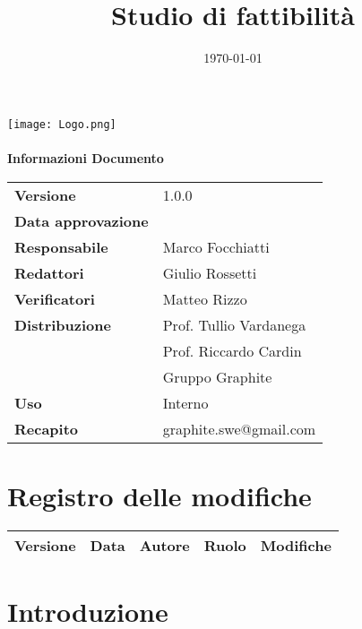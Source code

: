 \documentclass[openany,12pt,a4paper]{report}
\title{Studio di fattibilità}
\author{}
\date{\today}
\newcommand{\versione}{1.0.0}
\begin{document}
	\makeatletter
	\begin{titlepage}
		\setlength{\headsep}{0pt}
		\begin{center}
			\texttt{[image: Logo.png]}\\[1em]
			{\huge \bfseries  \@title }\\[10ex]
			\textbf{\Large Informazioni Documento} \\[2em]
			\bgroup
			\def\arraystretch{1.5}
			\begin{tabular}{l|l}
				\textbf{Versione} & \versione{} \\
				\textbf{Data approvazione} & \large \@date \\
				\textbf{Responsabile} & Marco Focchiatti \\
				\textbf{Redattori} & Giulio Rossetti \\
				\textbf{Verificatori} & Matteo Rizzo \\
				\textbf{Distribuzione} & Prof. Tullio Vardanega \\
				& Prof. Riccardo Cardin \\
				& Gruppo Graphite \\
				\textbf{Uso} & Interno \\
				\textbf{Recapito} & graphite.swe@gmail.com \\
			\end{tabular}
			\egroup
		\end{center}
	\end{titlepage}
	\makeatother

	\thispagestyle{empty}
	\newpage
	
	
	\chapter*{Registro delle modifiche}
	\begin{center}	
		\begin{tabular}{|c|c|c|c|p{4cm}|}
			\hline
			\textbf{Versione} & \textbf{Data} & \textbf{Autore} & \textbf{Ruolo} & \textbf{Modifiche} \\ \hline
			
		\end{tabular}
	\end{center}


	\tableofcontents


	\chapter{Introduzione}
\end{document}
